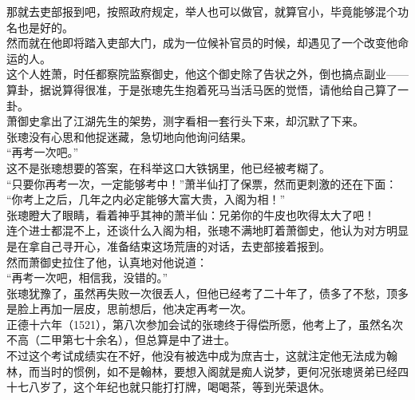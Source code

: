 \begin{multicols}{\theparacolNo}
那就去吏部报到吧，按照政府规定，举人也可以做官，就算官小，毕竟能够混个功名也是好的。\\

然而就在他即将踏入吏部大门，成为一位候补官员的时候，却遇见了一个改变他命运的人。\\

这个人姓萧，时任都察院监察御史，他这个御史除了告状之外，倒也搞点副业——算卦，据说算得很准，于是张璁先生抱着死马当活马医的觉悟，请他给自己算了一卦。\\

萧御史拿出了江湖先生的架势，测字看相一套行头下来，却沉默了下来。\\

张璁没有心思和他捉迷藏，急切地向他询问结果。\\

“再考一次吧。”\\

这不是张璁想要的答案，在科举这口大铁锅里，他已经被考糊了。\\

“只要你再考一次，一定能够考中！”萧半仙打了保票，然而更刺激的还在下面：\\

“你考上之后，几年之内必定能够大富大贵，入阁为相！”\\

张璁瞪大了眼睛，看着神乎其神的萧半仙：兄弟你的牛皮也吹得太大了吧！\\

连个进士都混不上，还谈什么入阁为相，张璁不满地盯着萧御史，他认为对方明显是在拿自己寻开心，准备结束这场荒唐的对话，去吏部接着报到。\\

然而萧御史拉住了他，认真地对他说道：\\

“再考一次吧，相信我，没错的。”\\

张璁犹豫了，虽然再失败一次很丢人，但他已经考了二十年了，债多了不愁，顶多是脸上再加一层皮，思前想后，他决定再考一次。\\

正德十六年（1521），第八次参加会试的张璁终于得偿所愿，他考上了，虽然名次不高（二甲第七十余名），但总算是中了进士。\\

不过这个考试成绩实在不好，他没有被选中成为庶吉士，这就注定他无法成为翰林，而当时的惯例，如不是翰林，要想入阁就是痴人说梦，更何况张璁贤弟已经四十七八岁了，这个年纪也就只能打打牌，喝喝茶，等到光荣退休。\\


\end{multicols}
